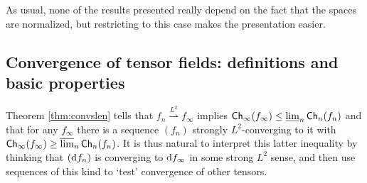 \documentclass[11pt]{article}
\numberwithin{equation}{section}
\newcommand{\ch}{{\sf Ch}}
\renewcommand{\d}{{\rm d}}
\newcommand{\lims}{\varlimsup}
\newcommand{\limi}{\varliminf}
\newcommand{\weakto}{\rightharpoonup}
\begin{document}
As usual, none of the results presented really depend on the fact that the spaces are normalized, but restricting to this case makes the presentation easier.


\subsection{Convergence of tensor fields: definitions and basic properties}\label{se:defconvtens}
Theorem \ref{thm:convslen} tells that $f_n\stackrel{L^2}\weakto f_\infty$ implies $\ch_\infty(f_\infty)\leq \limi_n\ch_n(f_n)$ and that for any $f_\infty$ there is a sequence $(f_n)$ strongly $L^2$-converging to it with $\ch_\infty(f_\infty)\geq \lims_n\ch_n(f_n)$. It is thus natural to interpret this latter inequality by thinking that $(\d f_n)$ is converging to $\d f_\infty$ in some strong $L^2$ sense, and then use sequences of this kind to `test' convergence of other tensors. 
\end{document}

